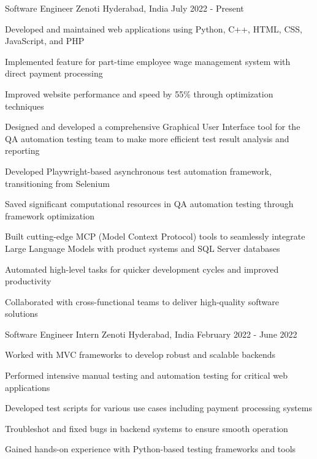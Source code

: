 \documentclass[11pt, a4paper]{awesome-cv} %
\begin{document}
\begin{cventries}
\cventry
    {Software Engineer} %
    {Zenoti} %
    {Hyderabad, India} %
    {July 2022 - Present} %
    {
      \begin{cvitems}
        \item {Developed and maintained web applications using Python, C++, HTML, CSS, JavaScript, and PHP}
        \item {Implemented feature for part-time employee wage management system with direct payment processing}
        \item {Improved website performance and speed by 55\% through optimization techniques}
        \item {Designed and developed a comprehensive Graphical User Interface tool for the QA automation testing team to make more efficient test result analysis and reporting}
        \item {Developed Playwright-based asynchronous test automation framework, transitioning from Selenium}
        \item {Saved significant computational resources in QA automation testing through framework optimization}
        \item {Built cutting-edge MCP (Model Context Protocol) tools to seamlessly integrate Large Language Models with product systems and SQL Server databases}
        \item {Automated high-level tasks for quicker development cycles and improved productivity}
        \item {Collaborated with cross-functional teams to deliver high-quality software solutions}
      \end{cvitems}
    }

\cventry
    {Software Engineer Intern} %
    {Zenoti} %
    {Hyderabad, India} %
    {February 2022 - June 2022} %
    {
      \begin{cvitems}
        \item {Worked with MVC frameworks to develop robust and scalable backends}
        \item {Performed intensive manual testing and automation testing for critical web applications}
        \item {Developed test scripts for various use cases including payment processing systems}
        \item {Troubleshot and fixed bugs in backend systems to ensure smooth operation}
        \item {Gained hands-on experience with Python-based testing frameworks and tools}
      \end{cvitems}
    }
\end{cventries}



\end{document}
